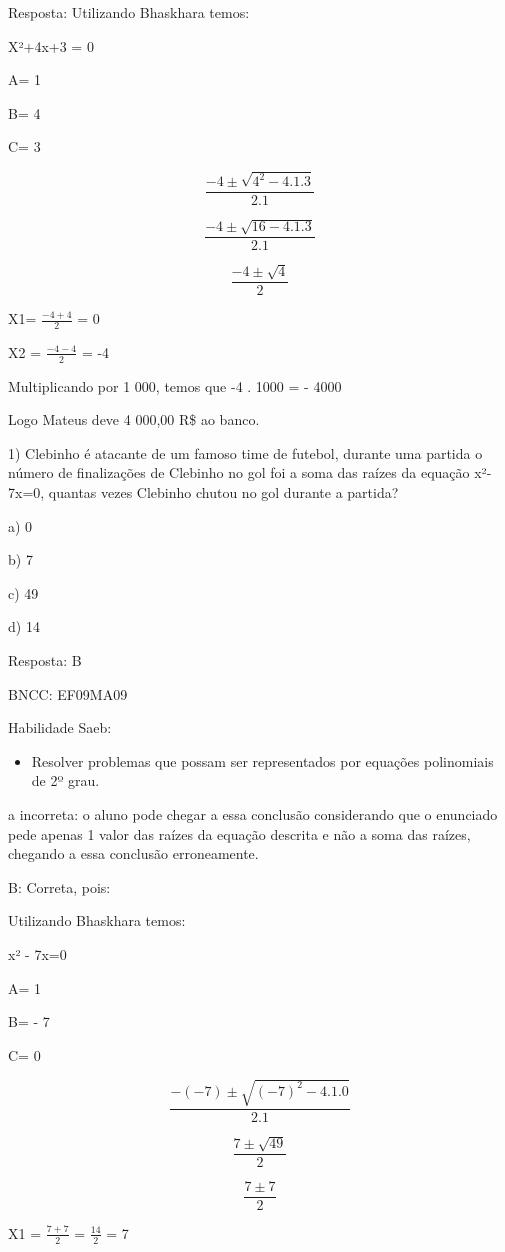 Resposta: Utilizando Bhaskhara temos:

X²+4x+3 = 0

A= 1

B= 4

C= 3

\[\frac{- 4 \pm \sqrt{4^{2} - 4.1.3}}{2.1}\]

\[\frac{- 4 \pm \sqrt{16 - 4.1.3}}{2.1}\]

\[\frac{- 4 \pm \sqrt{4}}{2}\]

X1= \(\frac{- 4 + 4}{2}\) = 0

X2 = \(\frac{- 4 - 4}{2}\) = -4

Multiplicando por 1 000, temos que -4 . 1000 = - 4000

Logo Mateus deve 4 000,00 R\$ ao banco.


1) Clebinho é atacante de um famoso time de futebol, durante uma partida
o número de finalizações de Clebinho no gol foi a soma das raízes da
equação x²- 7x=0, quantas vezes Clebinho chutou no gol durante a
partida?

a) 0

b) 7

c) 49

d) 14

Resposta: B

BNCC: EF09MA09

Habilidade Saeb:

\begin{itemize}
\tightlist
\item
  Resolver problemas que possam ser representados por equações
  polinomiais de 2º grau.
\end{itemize}

a incorreta: o aluno pode chegar a essa conclusão considerando que o
enunciado pede apenas 1 valor das raízes da equação descrita e não a
soma das raízes, chegando a essa conclusão erroneamente.

B: Correta, pois:

Utilizando Bhaskhara temos:

x² - 7x=0

A= 1

B= - 7

C= 0

\[\frac{- ( - 7) \pm \sqrt{{( - 7)}^{2} - 4.1.0}}{2.1}\]

\[\frac{7 \pm \sqrt{49}}{2}\]

\[\frac{7 \pm 7}{2}\]

X1 = \(\frac{7 + 7}{2}\) = \(\frac{14}{2}\) = 7

